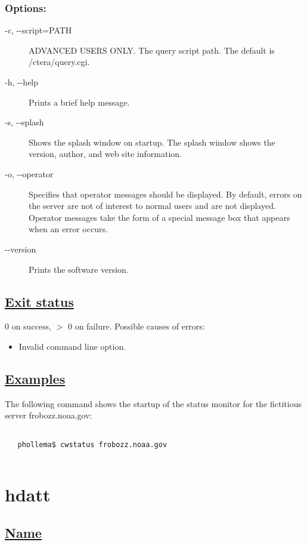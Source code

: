 \subsubsection*{Options:}
\begin{description}
\item[ -c, -{-}script=PATH ] ADVANCED USERS ONLY. The query script path. The default is /ctera/query.cgi. 
\item[ -h, -{-}help ] Prints a brief help message. 
\item[-s, -{-}splash]Shows the splash window on startup. The splash window shows the version, author, and web site information.
\item[ -o, -{-}operator ] Specifies that operator messages should be displayed. By default, errors on the server are not of interest to normal users and are not displayed. Operator messages take the form of a special message box that appears when an error occurs.
\item[-{-}version]Prints the software version.

\end{description}
\subsection*{\underline{Exit status}}


  0 on success, $>$ 0 on failure. Possible causes of errors:
\begin{itemize}
\item  Invalid command line option. 

\end{itemize}
\subsection*{\underline{Examples}}


  The following command shows the startup of the status monitor for the fictitious server frobozz.noaa.gov:
\begin{verbatim}

   phollema$ cwstatus frobozz.noaa.gov
 
\end{verbatim}

\newpage
\section{hdatt} \hypertarget{hdatt}{}
\subsection*{\underline{Name}}


